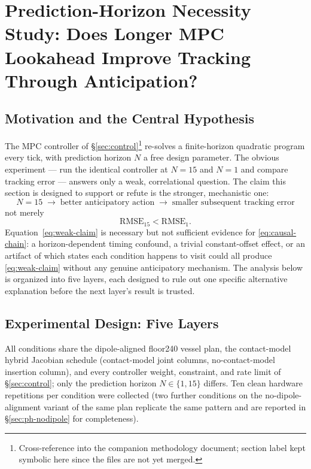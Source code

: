 \documentclass[11pt]{article}
\begin{document}
\section{Prediction-Horizon Necessity Study: Does Longer MPC Lookahead Improve Tracking Through Anticipation?}
\label{sec:horizon-necessity}

\subsection{Motivation and the Central Hypothesis}
\label{sec:ph-motivation}

The MPC controller of \S\ref{sec:control}\footnote{Cross-reference
into the companion methodology document; section label kept symbolic
here since the files are not yet merged.} re-solves a finite-horizon
quadratic program every tick, with prediction horizon $N$ a free
design parameter. The obvious experiment --- run the identical
controller at $N{=}15$ and $N{=}1$ and compare tracking error ---
answers only a weak, correlational question. The claim this section
is designed to support or refute is the stronger, mechanistic one:
\begin{equation}
\boxed{
N{=}15 \;\rightarrow\; \text{better anticipatory action}
\;\rightarrow\; \text{smaller subsequent tracking error}
}
\label{eq:causal-chain}
\end{equation}
not merely
\begin{equation}
\boxed{\mathrm{RMSE}_{15} < \mathrm{RMSE}_{1}.}
\label{eq:weak-claim}
\end{equation}
Equation~\eqref{eq:weak-claim} is necessary but not sufficient
evidence for \eqref{eq:causal-chain}: a horizon-dependent timing
confound, a trivial constant-offset effect, or an artifact of which
states each condition happens to visit could all produce
\eqref{eq:weak-claim} without any genuine anticipatory mechanism. The
analysis below is organized into five layers, each designed to rule
out one specific alternative explanation before the next layer's
result is trusted.

\subsection{Experimental Design: Five Layers}
\label{sec:ph-design}

All conditions share the dipole-aligned floor240 vessel plan, the
contact-model hybrid Jacobian schedule (contact-model joint columns,
no-contact-model insertion column), and every controller weight,
constraint, and rate limit of \S\ref{sec:control}; only the
prediction horizon $N\in\{1,15\}$ differs. Ten clean hardware
repetitions per condition were collected (two further conditions on
the no-dipole-alignment variant of the same plan replicate the same
pattern and are reported in \S\ref{sec:ph-nodipole} for completeness).
\end{document}
